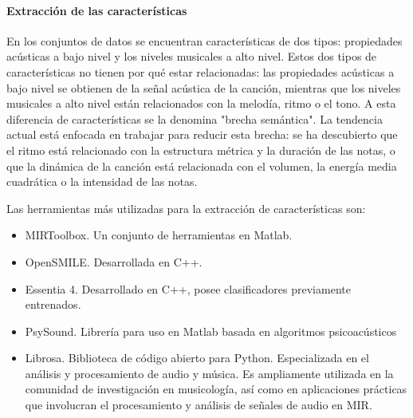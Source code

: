 \documentclass[12pt,a4paper,Spanish]{article}
\begin{document}
\paragraph{Extracción de las características}
En los conjuntos de datos se encuentran características de dos tipos: propiedades acústicas a bajo nivel y los niveles musicales a alto nivel. Estos dos tipos de características no tienen por qué estar relacionadas: las propiedades acústicas a bajo nivel se obtienen de la señal acústica de la canción, mientras que los niveles musicales a alto nivel están relacionados con la melodía, ritmo o el tono.
\newline
A esta diferencia de características se la denomina "brecha semántica". La tendencia actual está enfocada en trabajar para reducir esta brecha: se ha descubierto que el ritmo está relacionado con la estructura métrica y la duración de las notas, o que la dinámica de la canción está relacionada con el volumen, la energía media cuadrática o la intensidad de las notas.


Las herramientas más utilizadas para la extracción de características son:
\begin{itemize}
	\item MIRToolbox. Un conjunto de herramientas en Matlab.
	\item OpenSMILE. Desarrollada en C++.
	\item Essentia 4. Desarrollado en C++, posee clasificadores previamente entrenados.
	\item PsySound. Librería para uso en Matlab basada en algoritmos psicoacústicos
	\item Librosa. Biblioteca de código abierto para Python. Especializada en el análisis y procesamiento de audio y música. Es ampliamente utilizada en la comunidad de investigación en musicología, así como en aplicaciones prácticas que involucran el procesamiento y análisis de señales de audio en MIR.
\end{itemize}
\end{document}
